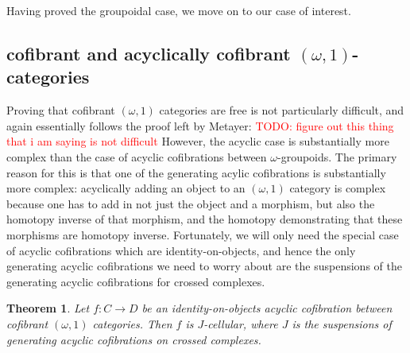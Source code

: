 \documentclass[12pt]{article}
\newtheorem{theorem}{Theorem}[section]
\theoremstyle{definition}
\newcommand{\TODO}[1]{\textcolor{red}{TODO: {#1}}}
\begin{document}
	
	
	
	Having proved the groupoidal case, we move on to our case of interest.
\subsection{cofibrant and acyclically cofibrant $(\omega,1)$-categories}
	Proving that cofibrant $(\omega,1)$ categories are free is not particularly difficult, and again essentially follows the proof left by Metayer:
	\TODO{figure out this thing that i am  saying is not difficult}
	However, the acyclic case is substantially more complex than the case of acyclic cofibrations between $\omega$-groupoids. The primary reason for this is that one of the generating acylic cofibrations is substantially more complex: acyclically adding an object to an $(\omega,1)$ category is complex because one has to add in not just the object and a morphism, but also the homotopy inverse of that morphism, and the homotopy demonstrating that these morphisms are homotopy inverse. Fortunately, we will only need the special case of acyclic cofibrations which are identity-on-objects, and hence the only generating acyclic cofibrations we need to worry about are the suspensions of the generating acyclic cofibrations for crossed complexes. 
	\begin{theorem}
		Let $f: C \to D$ be an identity-on-objects acyclic cofibration between cofibrant $(\omega,1)$ categories. Then $f$ is $J$-cellular, where $J$ is the suspensions of generating acyclic cofibrations on crossed complexes.
	\end{theorem}
\end{document}
